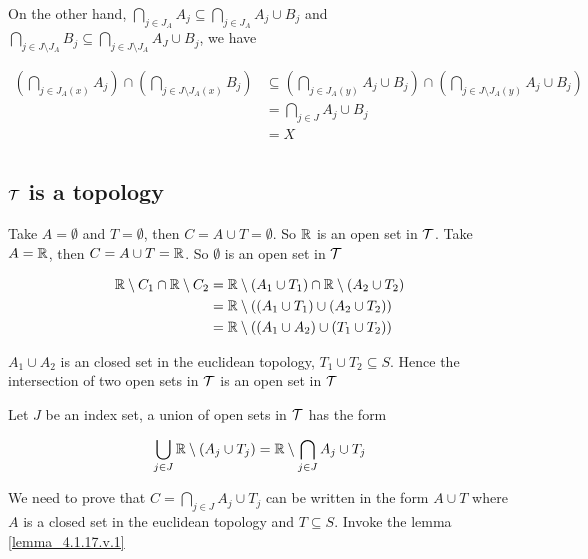 \documentclass{article}
\begin{document}
On the other hand, $\bigcap_{j \in J_A} A_j \subseteq \bigcap_{j \in J_A} A_j \cup B_j$ and $\bigcap_{j \in J \setminus J_A}  B_j \subseteq \bigcap_{j \in J \setminus J_A}  A_J \cup B_j$, we have

\begin{align*}
    \left( \bigcap_{j \in J_A(x)} A_j \right) \cap \left( \bigcap_{j \in J \setminus J_A(x)}  B_j \right)
        &\subseteq \left( \bigcap_{j \in J_A(y)} A_j \cup B_j \right) \cap \left( \bigcap_{j \in J \setminus J_A(y)}  A_j \cup B_j \right) \\
        &= \bigcap_{j \in J} A_j \cup B_j \\
        &= X \\
\end{align*}

\subsection*{$\mathcal{T}$ is a topology}

Take $A = \emptyset$ and $T = \emptyset$, then $C = A \cup T = \emptyset$. So $\mathbb{R}$ is an open set in $\mathcal{T}$. Take $A = \mathbb{R}$, then $C = A \cup T = \mathbb{R}$. So $\emptyset$ is an open set in $\mathcal{T}$

\begin{align*}
    \mathbb{R} \setminus C_1 \cap \mathbb{R} \setminus C_2  &= \mathbb{R} \setminus (A_1 \cup T_1) \cap \mathbb{R} \setminus (A_2 \cup T_2) \\
                                                            &= \mathbb{R} \setminus ((A_1 \cup T_1) \cup (A_2 \cup T_2)) \\
                                                            &= \mathbb{R} \setminus ((A_1 \cup A_2) \cup (T_1 \cup T_2)) \\
\end{align*}

$A_1 \cup A_2$ is an closed set in the euclidean topology, $T_1 \cup T_2 \subseteq S$. Hence the intersection of two open sets in $\mathcal{T}$ is an open set in $\mathcal{T}$

Let $J$ be an index set, a union of open sets in $\mathcal{T}$ has the form

$$
    \bigcup_{j \in J} \mathbb{R} \setminus (A_j \cup T_j) = \mathbb{R} \setminus \bigcap_{j \in J} A_j \cup T_j
$$

We need to prove that $C = \bigcap_{j \in J} A_j \cup T_j$ can be written in the form $A \cup T$ where $A$ is a closed set in the euclidean topology and $T \subseteq S$. Invoke the lemma \ref{lemma_4.1.17.v.1}
\end{document}
